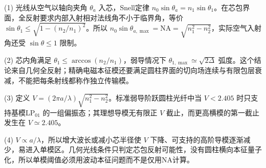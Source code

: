 (1) 光线从空气以轴向夹角 \(\theta_a\) 入芯，Snell定律 \(n_0\sin\theta_a=n_1\sin\theta_1\)。在芯包界面，全反射要求内部入射相对法线角不小于临界角，等价 \(\sin\theta_1\le\sqrt{1-(n_2/n_1)^2}\)。所以 \(\boxed{n_0\sin\theta_{a,\max}=\mathrm{NA}=\sqrt{n_1^2-n_2^2}}\)，实际空气入射角还受 \(\sin\theta\le1\) 限制。

(2) 芯内角满足 \(\theta_1\le\arccos(n_2/n_1)\)，弱导情况下 \(\theta_{1,\max}\simeq\sqrt{2\Delta}\) 弧度。这个结论来自几何全反射；精确电磁本征模还要满足圆柱界面的切向场连续与有限包层衰减，不能把每条射线都称作独立传输模。

(3) 定义 \(\boxed{V=(2\pi a/\lambda)\sqrt{n_1^2-n_2^2}}\)。标准弱导阶跃圆柱光纤中当 \(V<2.405\) 时只支持基模LP\(_{01}\) 的一组偏振态；其理想导模无有限正 \(V\) 截止，而更高横模的第一截止发生在 \(V\simeq2.405\)。

(4) \(V\propto a/\lambda\)，所以增大波长或减小芯半径使 \(V\) 下降、可支持的高阶导模逐渐减少，易进入单模区。几何光线条件只判定芯包反射可能性，没有圆柱横向本征量子化，所以单模阈值必须用波动本征问题而不是仅用NA计算。
